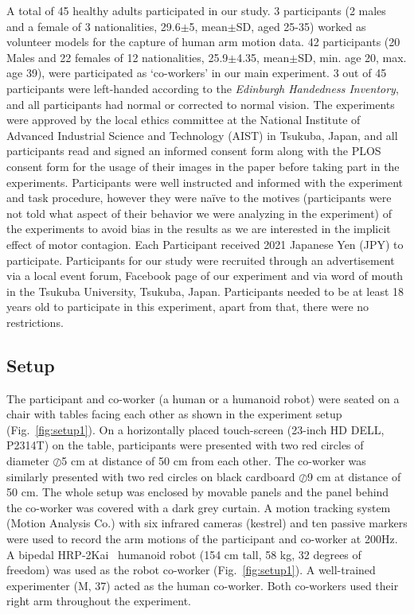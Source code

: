 A total of 45 healthy adults participated in our study. 3 participants (2 males and a female of 3 nationalities, 29.6$\pm$5, mean$\pm$SD, aged 25-35) worked as volunteer models for the capture of human arm motion data. 42 participants (20 Males and 22 females of 12 nationalities, 25.9$\pm$4.35, mean$\pm$SD, min. age 20, max. age 39), were participated as `co-workers' in our main experiment. 3 out of 45 participants were left-handed according to the {\it Edinburgh Handedness Inventory}, and all participants had normal or corrected to normal vision. The experiments were approved by the local ethics committee at the National Institute of Advanced Industrial Science and Technology (AIST) in Tsukuba, Japan, and all participants read and signed an informed consent form along with the PLOS consent form for the usage of their images in the paper before taking part in the experiments. Participants were well instructed and informed with the experiment and task procedure, however they were na\"ive to the motives (participants were not told what aspect of their behavior we were analyzing in the experiment) of the experiments to avoid bias in the results as we are interested in the implicit effect of motor contagion. Each Participant received 2021 Japanese Yen (JPY) to participate. 
Participants for our study were recruited through an advertisement via a local event forum, Facebook page of our experiment and via word of mouth in the Tsukuba University, Tsukuba, Japan. Participants needed to be at least 18 years old to participate in this experiment, apart from that, there were no restrictions.

\subsection{Setup}

The participant and co-worker (a human or a humanoid robot) were seated on a chair with tables facing each other as shown in the experiment setup (Fig.~\ref{fig:setup1}). On a horizontally placed touch-screen (23-inch HD DELL, P2314T) on the table, participants were presented with two red circles of diameter $\oslash$5 cm at distance of 50 cm from each other. The co-worker was similarly presented with two red circles on black cardboard $\oslash$9 cm at distance of 50 cm. The whole setup was enclosed by movable panels and the panel behind the co-worker was covered with a dark grey curtain. A motion tracking system (Motion Analysis Co.) with six infrared cameras (kestrel) and ten passive markers were used to record the arm motions of the participant and co-worker at 200Hz. A bipedal HRP-2Kai~\cite{Kaneko:RAS_ICHR:2015} humanoid robot (154 cm tall, 58 kg, 32 degrees of freedom) was used as the robot co-worker (Fig.~\ref{fig:setup1}). A well-trained experimenter (M, 37) acted as the human co-worker. Both co-workers used their right arm throughout the experiment.

